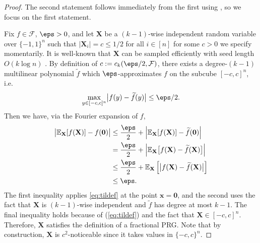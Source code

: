 \begin{proof}
The second statement follows immediately from the first using , so we focus on the first statement.

Fix $f\in \mathcal{F}$, $\eps>0$, and let $\mathbf{X}$ be a $(k-1)$-wise independent random variable over $\{-1,1\}^n$ such that $\vert \mathbf{X}_i\vert=c \leq 1/2$ for all $i \in [n]$ for some $c>0$ we specify momentarily. It is well-known that $\mathbf{X}$ can be sampled efficiently with seed length $O(k\log n)$ \cite{vadhan2012pseudorandomness}. By definition of $c:=c_k(\eps/2,\mathcal{F})$, there exists a degree-$(k-1)$ multilinear polynomial $\widetilde{f}$ which $\eps$-approximates $f$ on the subcube $[-c,c]^n$, i.e.
\begin{equation}
\label{eq:tildef}
            \max_{ y \in [-c,c]^n } \bigl| f(y) - \widetilde{f}(y) \bigr| \leq \eps/2.
\end{equation}
Then we have, via the Fourier expansion of $f$,
\begin{align*}
    \bigl| \mathbb{E}_{\mathbf{X}}[f(\mathbf{X})]-f(\mathbf{0})\bigr|
    &\leq \frac{\eps}{2} + \left\vert \mathbb{E}_{\mathbf{X}}[f(\mathbf{X})]-\widetilde{f}(\mathbf{0})\right\vert\\
    &=\frac{\eps}{2} + \left\vert \mathbb{E}_{\mathbf{X}}\bigl[f(\mathbf{X})-\widetilde{f}(\mathbf{\mathbf{X}})\bigr]\right\vert\\
    &\leq \frac{\eps}{2} +  \mathbb{E}_{\mathbf{X}}\left[ \bigl| f(\mathbf{X})-\widetilde{f}(\mathbf{\mathbf{X}})\bigr| \right]\\
    &\leq \eps.
\end{align*}
The first inequality applies \cref{eq:tildef} at the point $\mathbf{x}=\mathbf{0}$, and the second uses the fact that $\mathbf{X}$ is $(k-1)$-wise independent and $\widetilde{f}$ has degree at most $k-1$. The final inequality holds because of (\ref{eq:tildef}) and the fact that $\mathbf{X}\in [-c,c]^n$.  Therefore, $\mathbf{X}$ satisfies the definition of a fractional PRG.  Note that by construction, $\mathbf{X}$ is $c^2$-noticeable since it takes values in $\{-c,c\}^n$.
\end{proof}

